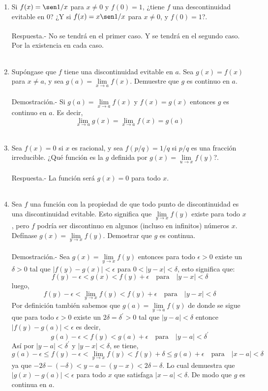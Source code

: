 \begin{enumerate}[\bfseries 1.]
\begin{enumerate}[\bfseries (a)]
    \item Si $f(x) = \sen 1/x$ para $x\neq 0$ y $f(0)=1$, ¿tiene $f$ una descontinuidad evitable en $0$? ¿Y si $f(x)=x \sen 1/x$ para $x\neq 0$, y $f(0)=1$?.\\\\
	Respuesta.-\; No se tendrá en el primer caso. Y se tendrá en el segundo caso. Por la existencia en cada caso.\\\\

    \item Supóngase que $f$ tiene una discontinuidad evitable en $a$. Sea $g(x)=f(x)$ para $x\neq a$, y sea $g(a) = \lim\limits_{x\to a} f(x).$ Demuestre que $g$ es continuo en $a$.\\\\
	Demostración.-\; Si $g(a) = \lim\limits_{x\to a} f(x)$ y $f(x)=g(x)$ entonces $g$ es continuo en $a$. Es decir,
	$$\lim_{x\to a} g(x) = \lim_{x\to a} f(x) = g(a)$$\\

    \item Sea $f(x) = 0$ si $x$ es racional, y sea $f(p/q) = 1/q$ si $p/q$ es una fracción irreducible. ¿Qué función es la $g$ definida por $g(x)=\lim\limits_{u\to x}f(y)$?.\\\\
	Respuesta.-\; La función será $g(x)=0$ para todo $x$.\\\\

    \item Sea $f$ una función con la propiedad de que todo punto de discontinuidad es una discontinuidad evitable. Esto significa que $\lim\limits_{y\to x} f(y)$ existe para todo $x$, pero $f$ podría ser discontinuo en algunos (incluso en infinitos) números $x$. Defínase $g(x)=\lim\limits_{y\to x}f(y)$. Demostrar que $g$ es continua.\\\\
	Demostración.-\; Sea $g(x)=\lim\limits_{y\to x}f(y)$ entonces para todo $\epsilon>0$ existe un $\delta>0$ tal que $|f(y)-g(x)|<\epsilon$ para $0<|y-x|<\delta$, esto significa que:
	$$f(y)-\epsilon < g(x)<f(y)+\epsilon \quad \mbox{para}\quad |y-x|<\delta$$
	luego,
	$$f(y)-\epsilon < \lim\limits_{y\to x} f(y)<f(y)+\epsilon \quad \mbox{para}\quad |y-x|<\delta$$
	Por definición también sabemos que $g(a) = \lim\limits_{y\to a} f(y)$ de donde se sigue que para todo $\epsilon>0$ existe un $2\delta = \delta^{'}>0$ tal que $|y-a|<\delta$ entonce $|f(y)-g(a)|<\epsilon$ es decir,
	$$g(a)-\epsilon < f(y) < g(a)+\epsilon \quad \mbox{para}\quad |y-a|<\delta^{'}$$
	Así por $|y-a|<\delta^{'}$ y $|y-x|<\delta$, se tiene,
	$$g(a)-\epsilon \leq f(y)-\epsilon < \lim\limits_{y\to x} f(y) < f(y)+\delta \leq g(a)+\epsilon \quad \mbox{para}\quad |x-a|<\delta$$
	ya que $-2\delta -(-\delta )<y-a-(y-x) < 2\delta - \delta$. Lo cual demuestra que $|g(x)-g(a)|<\epsilon$ para todo $x$ que satisfaga $|x-a|<\delta$. De modo que $g$ es continua en $a$.\\\\ 


\end{enumerate}
\end{enumerate}
